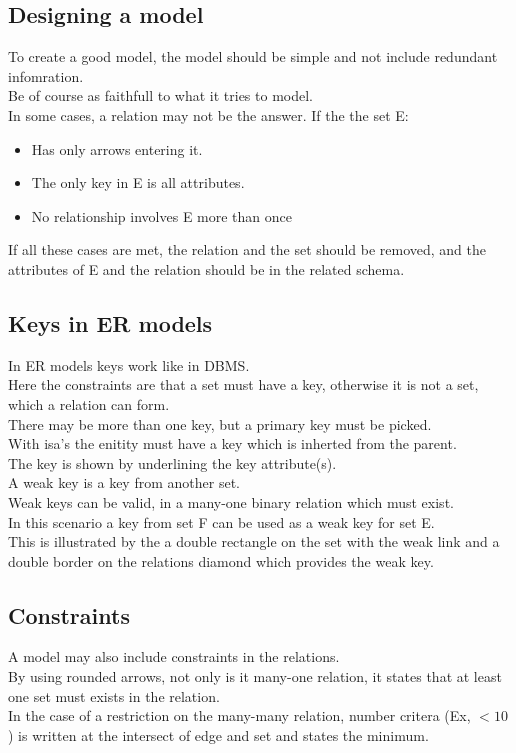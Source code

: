 \documentclass[12pt, a4paper]{article}
\begin{document}
		\subsection{Designing a model}
			To create a good model, the model should be simple and not include redundant infomration.\\
			Be of course as faithfull to what it tries to model.\\
			In some cases, a relation may not be the answer. If the the set E:
			\begin{itemize}
						\item Has only arrows entering it.
						\item The only key in E is all attributes.
						\item No relationship involves E more than once
			\end{itemize}
			If all these cases are met, the relation and the set should be removed, and the attributes of E and the relation should be in the related schema.\\
		\subsection{Keys in ER models}
			In ER models keys work like in DBMS.\\
			Here the constraints are that a set must have a key, otherwise it is not a set, which a relation can form.\\
			There may be more than one key, but a primary key must be picked.\\
			With isa's the enitity must have a key which is inherted from the parent.\\
			The key is shown by underlining the key attribute(s).\\
			A weak key is a key from another set.\\
			Weak keys can be valid, in a many-one binary relation which must exist.\\
			In this scenario a key from set F can be used as a weak key for set E.\\
			This is illustrated by the a double rectangle on the set with the weak link and a double border on the relations diamond which provides the weak key.
		\subsection{Constraints}
			A model may also include constraints in the relations.\\
			By using rounded arrows, not only is it many-one relation, it states that at least one set must exists in the relation.\\
			In the case of a restriction on the many-many relation, number critera (Ex, $<10$) is written at the intersect of edge and set and states the minimum.
\end{document}
